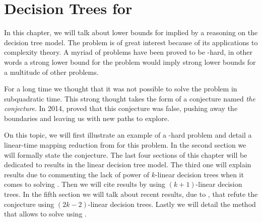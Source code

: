 \chapter{Decision Trees for \threeSUM}
\label{tree:3sum}

In this chapter, we will talk about lower bounds for \threeSUM implied by a
reasoning on the decision tree model. The \threeSUM problem is of great
interest because of its applications to complexity theory. A myriad of problems
have been proved to be \threeSUM-hard, in other words a strong lower bound for
the \threeSUM problem would imply strong lower bounds for a multitude of other
problems.

For a long time we thought that it was not possible to solve the \threeSUM
problem in subquadratic time. This strong thought takes the form of a
conjecture named \emph{the \threeSUM conjecture}. In 2014, \citet*{gronlund:2014}
proved that this conjecture was false, pushing away the
boundaries and leaving us with new paths to explore.

On this topic, we will first illustrate an example of a \threeSUM-hard problem
and detail a linear-time mapping reduction from \threeSUM for this problem. In
the second section we will formally state the \threeSUM conjecture. The last
four sections of this chapter will be dedicated to results in the linear
decision tree model. The third one will explain results due to
\citet*{erickson:1999} commenting the lack of power of $k$-linear decision
trees when it comes to solving \ksum. Then we will cite results by
\citet*{ailon:2005} using $(k+1)$-linear decision trees.  In the fifth section
we will talk about recent results, due to \citet*{gronlund:2014}, that refute
the \threeSUM conjecture using $(2k-2)$-linear decision trees. Lastly we will
detail the method that allows to solve \kLDT using \threeSUM.
